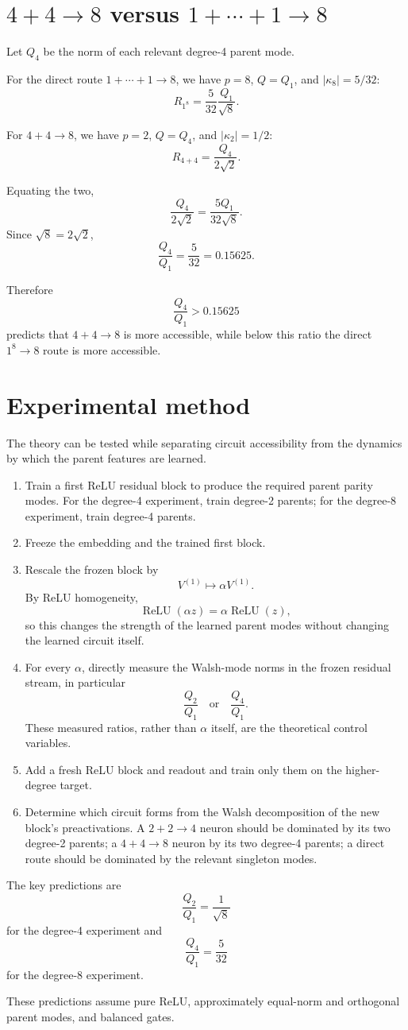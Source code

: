 \documentclass[11pt]{article}
\begin{document}
\section{\texorpdfstring{\(4+4\to8\)}{4+4 to 8} versus \texorpdfstring{\(1+\cdots+1\to8\)}{direct degree-8}}

Let \(Q_4\) be the norm of each relevant degree-4 parent mode.

For the direct route \(1+\cdots+1\to8\), we have \(p=8\), \(Q=Q_1\), and \(|\kappa_8|=5/32\):
\[
R_{1^8}
=
\frac{5}{32}\frac{Q_1}{\sqrt8}.
\]

For \(4+4\to8\), we have \(p=2\), \(Q=Q_4\), and \(|\kappa_2|=1/2\):
\[
R_{4+4}
=
\frac{Q_4}{2\sqrt2}.
\]

Equating the two,
\[
\frac{Q_4}{2\sqrt2}
=
\frac{5Q_1}{32\sqrt8}.
\]
Since \(\sqrt8=2\sqrt2\),
\[
\boxed{
\frac{Q_4}{Q_1}
=
\frac{5}{32}
=
0.15625.
}
\]

Therefore
\[
\frac{Q_4}{Q_1}>0.15625
\]
predicts that \(4+4\to8\) is more accessible, while below this ratio the direct \(1^8\to8\) route is more accessible.

\section{Experimental method}

The theory can be tested while separating circuit accessibility from the dynamics by which the parent features are learned.

\begin{enumerate}
    \item Train a first ReLU residual block to produce the required parent parity modes. For the degree-4 experiment, train degree-2 parents; for the degree-8 experiment, train degree-4 parents.

    \item Freeze the embedding and the trained first block.

    \item Rescale the frozen block by
    \[
    V^{(1)}\mapsto \alpha V^{(1)}.
    \]
    By ReLU homogeneity,
    \[
    \operatorname{ReLU}(\alpha z)=\alpha\operatorname{ReLU}(z),
    \]
    so this changes the strength of the learned parent modes without changing the learned circuit itself.

    \item For every \(\alpha\), directly measure the Walsh-mode norms in the frozen residual stream, in particular
    \[
    \frac{Q_2}{Q_1}
    \quad\text{or}\quad
    \frac{Q_4}{Q_1}.
    \]
    These measured ratios, rather than \(\alpha\) itself, are the theoretical control variables.

    \item Add a fresh ReLU block and readout and train only them on the higher-degree target.

    \item Determine which circuit forms from the Walsh decomposition of the new block's preactivations. A \(2+2\to4\) neuron should be dominated by its two degree-2 parents; a \(4+4\to8\) neuron by its two degree-4 parents; a direct route should be dominated by the relevant singleton modes.
\end{enumerate}

The key predictions are
\[
\boxed{\frac{Q_2}{Q_1}=\frac1{\sqrt8}}
\]
for the degree-4 experiment and
\[
\boxed{\frac{Q_4}{Q_1}=\frac5{32}}
\]
for the degree-8 experiment.

These predictions assume pure ReLU, approximately equal-norm and orthogonal parent modes, and balanced gates.
\end{document}
